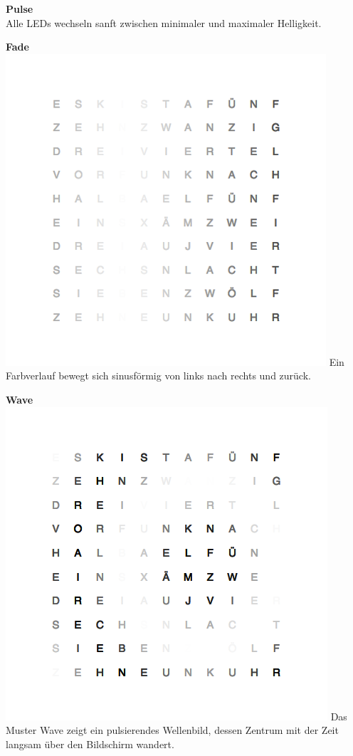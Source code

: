 \begin{multicols}{2}
\textbf{Pulse} \\
Alle LEDs wechseln sanft zwischen minimaler und maximaler Helligkeit.

\textbf{Fade} \\
\includegraphics[width=\columnwidth]{Abbildungen/Software/Demo/Fade}
Ein Farbverlauf bewegt sich sinusförmig von links nach rechts und zurück.

\textbf{Wave} \\
\includegraphics[width=\columnwidth]{Abbildungen/Software/Demo/Welle}
Das Muster Wave zeigt ein pulsierendes Wellenbild, dessen Zentrum mit der Zeit langsam über den Bildschirm wandert.


\end{multicols}
